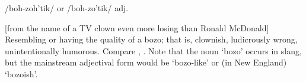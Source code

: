  /boh-zoh'tik/ or /boh-zo'tik/ adj.

[from the name of a TV clown even more losing than Ronald McDonald] Resembling
or having the quality of a bozo; that is, clownish, ludicrously wrong,
unintentionally humorous. Compare , . Note
that the noun `bozo' occurs in slang, but the mainstream adjectival form would
be `bozo-like' or (in New England) `bozoish'.

